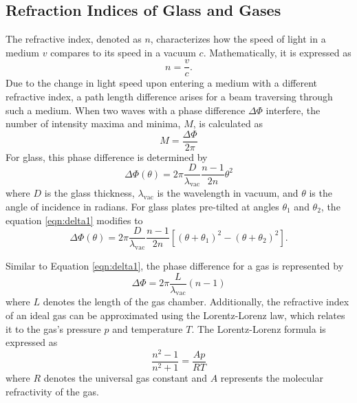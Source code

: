\subsection{Refraction Indices of Glass and Gases}
The refractive index, denoted as $n$, characterizes how the speed of light in a medium $v$ 
compares to its speed in a vacuum $c$. Mathematically, it is expressed as
\begin{equation*}
    n=\frac{v}{c}.
\end{equation*}
Due to the change in light speed upon entering a medium with a different refractive index, 
a path length difference arises for a beam traversing through such a medium. 
When two waves with a phase difference $\Delta\Phi$ interfere, the number of intensity 
maxima and minima, $M$, is calculated as
\begin{equation}
    M=\frac{\Delta\Phi}{2\pi}
    \label{eqn:M}
\end{equation}
For glass, this phase difference is determined by
\begin{equation}
    \Delta\Phi(\theta)=2\pi\frac{D}{\lambda_\text{vac}}\frac{n-1}{2n}\theta^2
    \label{eqn:delta1}
\end{equation}
where $D$ is the glass thickness, $\lambda_\text{vac}$ is the wavelength in vacuum, and $\theta$ 
is the angle of incidence in radians. For glass plates pre-tilted at angles $\theta_1$ and $\theta_2$, 
the equation \eqref{eqn:delta1} modifies to
\begin{equation}
    \Delta\Phi(\theta)=2\pi\frac{D}{\lambda_\text{vac}}\frac{n-1}{2n}[(\theta+\theta_1)^2-(\theta+\theta_2)^2].
    \label{eqn:delta}
\end{equation}

Similar to Equation \eqref{eqn:delta1}, the phase difference for a gas is represented by
\begin{equation*}
    \Delta\Phi=2\pi\frac{L}{\lambda_\text{vac}}(n-1)
\end{equation*}
where $L$ denotes the length of the gas chamber.
Additionally, the refractive index of an ideal gas can be approximated using the Lorentz-Lorenz law, 
which relates it to the gas's pressure $p$ and temperature $T$. The Lorentz-Lorenz formula is expressed as
\begin{equation}
    \frac{n^2-1}{n^2+1}=\frac{Ap}{RT}
    \label{eqn:LLL}
\end{equation}
where $R$ denotes the universal gas constant and $A$ represents the molecular refractivity of the gas.
